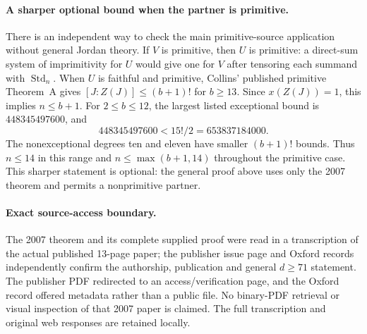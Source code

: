 \paragraph{A sharper optional bound when the partner is primitive.}
There is an independent way to check the main primitive-source
application without general Jordan theory. If \(V\) is primitive,
then \(U\) is primitive: a direct-sum system of imprimitivity for
\(U\) would give one for \(V\) after tensoring each summand with
\(\operatorname{Std}_n\).
When \(U\) is faithful and primitive, Collins' published primitive
Theorem~A \cite[p.~761]{LQ:Collins2008} gives
\([J:Z(J)]\le(b+1)!\) for \(b\ge13\).
Since \(x(Z(J))=1\), this implies \(n\le b+1\).
For \(2\le b\le12\), the largest listed exceptional bound is
\(448345497600\), and
\[
                448345497600<15!/2=653837184000.
 \tag{SSJ.7}
\]
The nonexceptional degrees ten and eleven have smaller
\((b+1)!\) bounds. Thus \(n\le14\) in this range and
\(n\le\max(b+1,14)\) throughout the primitive case.
This sharper statement is optional: the general proof above uses
only the 2007 theorem and permits a nonprimitive partner.

\paragraph{Exact source-access boundary.}
The 2007 theorem and its complete supplied proof were read in a
transcription of the actual published 13-page paper; the publisher
issue page and Oxford records independently confirm the authorship,
publication and general \(d\ge71\) statement. The publisher PDF
redirected to an access/verification page, and the Oxford record
offered metadata rather than a public file. No binary-PDF retrieval
or visual inspection of that 2007 paper is claimed. The full
transcription and original web responses are retained locally.
